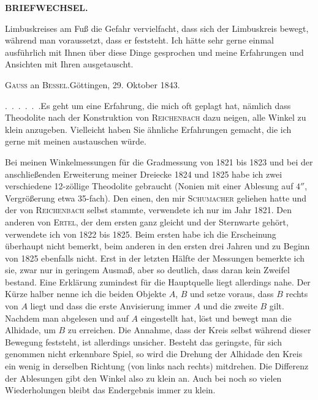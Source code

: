 \par\clearpage
\noindent{}\hfill{\small\textbf{BRIEFWECHSEL.}}\hfill\null\par\medskip
\noindent Limbuskreises am Fuß die Gefahr vervielfacht, dass sich der Limbuskreis bewegt, während man voraussetzt, dass er feststeht. Ich hätte sehr gerne einmal ausführlich mit Ihnen über diese Dinge gesprochen und meine Erfahrungen und Ansichten mit Ihren ausgetauscht.
\par\bigskip
\begin{center}{\large\textsc{Gauss} an \textsc{Bessel}.\quad Göttingen, 29. Oktober 1843.}\end{center}
\par\noindent\hspace*{\parindent}.\ .\ .\ .\ .\ .\enspace Es geht um eine Erfahrung, die mich oft geplagt hat, nämlich dass Theodolite nach der Konstruktion von \textsc{Reichenbach} dazu neigen, alle Winkel zu klein anzugeben. Vielleicht haben Sie ähnliche Erfahrungen gemacht, die ich gerne mit meinen austauschen würde.

\par\noindent\hspace*{\parindent}Bei meinen Winkelmessungen für die Gradmessung von 1821 bis 1823 und bei der anschließenden Erweiterung meiner Dreiecke 1824 und 1825 habe ich zwei verschiedene 12-zöllige Theodolite gebraucht (Nonien mit einer Ablesung auf $4''$, Vergrößerung etwa 35-fach). Den einen, den mir \textsc{Schumacher} geliehen hatte und der von \textsc{Reichenbach} selbst stammte, verwendete ich nur im Jahr 1821. Den anderen von \textsc{Ertel}, der dem ersten ganz gleicht und der Sternwarte gehört, verwendete ich von 1822 bis 1825. Beim ersten habe ich die Erscheinung überhaupt nicht bemerkt, beim anderen in den ersten drei Jahren und zu Beginn von 1825 ebenfalls nicht. Erst in der letzten Hälfte der Messungen bemerkte ich sie, zwar nur in geringem Ausmaß, aber so deutlich, dass daran kein Zweifel bestand. Eine Erklärung zumindest für die Hauptquelle liegt allerdings nahe. Der Kürze halber nenne ich die beiden Objekte $A$, $B$ und setze voraus, dass $B$ rechts von $A$ liegt und dass die erste Anvisierung immer $A$ und die zweite $B$ gilt. Nachdem man abgelesen und auf $A$ eingestellt hat, löst und bewegt man die Alhidade, um $B$ zu erreichen. Die Annahme, dass der Kreis selbst während dieser Bewegung  feststeht, ist allerdings unsicher. Besteht das geringste, für sich genommen nicht erkennbare Spiel, so wird die Drehung der Alhidade den Kreis ein wenig in derselben Richtung (von links nach rechts) mitdrehen. Die Differenz der Ablesungen gibt den Winkel also zu klein an. Auch bei noch so vielen Wiederholungen bleibt das Endergebnis immer zu klein.


